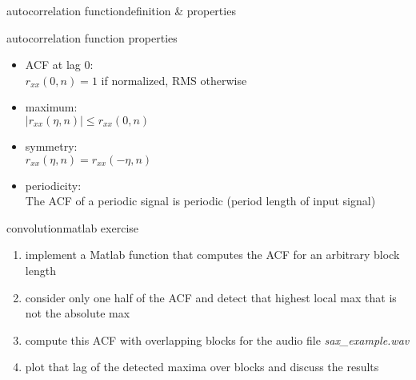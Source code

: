         \begin{frame}{autocorrelation function}{definition \& properties}
            \begin{block}{autocorrelation function properties}
                \begin{itemize}
                    \item	{ACF} at lag $0$:\\
                    $r_{xx}(0,n) = 1$ if normalized, RMS otherwise
                
                    \item	maximum:\\
                    $|r_{xx}(\eta,n)| \leq r_{xx}(0,n)$ 
                    \item	symmetry:\\
                    $r_{xx}(\eta,n) = r_{xx}(-\eta,n)$
                    \item	periodicity:\\
                    The {ACF} of a periodic signal is periodic (period length of input signal)
                \end{itemize}	
            \end{block}
        \end{frame}	
        \begin{frame}{convolution}{matlab exercise}
            
            \begin{enumerate}
                \item   implement a Matlab function that computes the ACF for an arbitrary block length
                \item   consider only one half of the ACF and detect that highest local max that is not the absolute max
                \item   compute this ACF with overlapping blocks for the audio file \textsl{sax\_example.wav} 
                \item   plot that lag of the detected maxima over blocks and discuss the results
            \end{enumerate}
        \end{frame}
            
